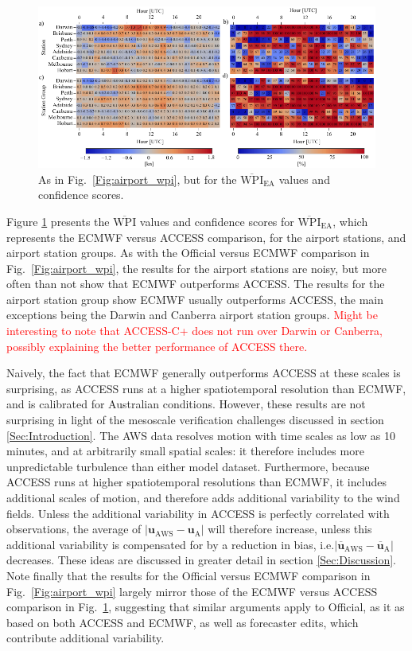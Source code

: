 \documentclass{ametsoc}
\begin{document}
\begin{figure}
\centering
\includegraphics[width=39pc]{airport_wpi_EA.pdf}
\caption{As in Fig.~\ref{Fig:airport_wpi}, but for the $\overline{\text{WPI}}_\text{EA}$ values and confidence scores.}
\label{Fig:airport_wpi_EA}
\end{figure}

Figure \ref{Fig:airport_wpi_EA} presents the $\overline{\text{WPI}}$ values and confidence scores for $\overline{\text{WPI}}_\text{EA}$, which represents the ECMWF versus ACCESS comparison, for the airport stations, and airport station groups. As with the Official versus ECMWF comparison in Fig.~\ref{Fig:airport_wpi}, the results for the airport stations are noisy, but more often than not show that ECMWF outperforms ACCESS. The results for the airport station group show ECMWF usually outperforms ACCESS, the main exceptions being the Darwin and Canberra airport station groups. \textcolor{red}{Might be interesting to note that ACCESS-C+ does not run over Darwin or Canberra, possibly explaining the better performance of ACCESS there.}

Naively, the fact that ECMWF generally outperforms ACCESS at these scales is surprising, as ACCESS runs at a higher spatiotemporal resolution than ECMWF, and is calibrated for Australian conditions. However, these results are not surprising in light of the mesoscale verification challenges discussed in section \ref{Sec:Introduction}. The AWS data resolves motion with time scales as low as 10 minutes, and at arbitrarily small spatial scales: it therefore includes more unpredictable turbulence than either model dataset. Furthermore, because ACCESS runs at higher spatiotemporal resolutions than ECMWF, it includes additional scales of motion, and therefore adds additional variability to the wind fields. Unless the additional variability in ACCESS is perfectly correlated with observations, the average of $\left\lvert \boldsymbol{u}_{\text{AWS}}-\boldsymbol{u}_{\text{A}} \right\rvert$
will therefore increase, unless this additional variability is compensated for by a reduction in bias, i.e.$\left\lvert \overline{\boldsymbol{u}}_{\text{AWS}}-\overline{\boldsymbol{u}}_{\text{A}} \right\rvert$ decreases. These ideas are discussed in greater detail in section \ref{Sec:Discussion}. Note finally that the results for the Official versus ECMWF comparison in Fig.~\ref{Fig:airport_wpi} largely mirror those of the ECMWF versus ACCESS comparison in Fig.~\ref{Fig:airport_wpi_EA}, suggesting that similar arguments apply to Official, as it as based on both ACCESS and ECMWF, as well as forecaster edits, which contribute additional variability.  
\end{document}
